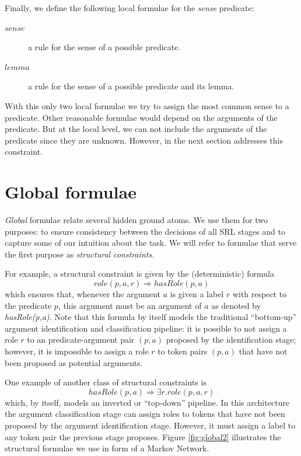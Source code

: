 Finally, we define the following local formulae for the \emph{sense} predicate:
\begin{description}
    \item[$sense$] a rule for the sense of a possible predicate.
    \item[$lemma$] a rule for the sense of a possible predicate and its lemma.
\end{description}
With this only two local formulae we try to assign the most common sense to a
predicate. Other reasonable formulae would depend on the arguments of the
predicate. But at the local level, we can not include the arguments of the
predicate since they are unknown. However, in the next section addresses this
constraint.

\section{Global formulae}
\label{sec:global}

\emph{Global} formulae relate several hidden ground atoms. We use them for two purposes: to ensure consistency between the decisions of all SRL stages and to capture some of our intuition about the task. We will refer to formulae that serve the first purpose as \emph{structural constraints}. 

For example, a structural constraint is given by the (deterministic) formula
\[role(p,a,r) \Rightarrow hasRole(p,a)\]
which ensures that, whenever the argument $a$ is given a label $r$ with respect to the predicate $p$, this argument must be an argument of $a$ as denoted by \emph{hasRole(p,a)}. Note that this formula by itself models the traditional ``bottom-up'' argument identification and classification pipeline: it is possible to not assign a role $r$ to an predicate-argument pair $(p,a)$ proposed by the identification stage; however, it is impossible to assign a role $r$ to token pairs $(p,a)$ that have not been proposed as potential arguments.

One example of another class of structural constraints is 
\[
hasRole(p,a)\Rightarrow\exists r.role(p,a,r)
\]
which, by itself, models an inverted or ``top-down'' pipeline. In this architecture the argument classification stage can assign roles to tokens that have not been proposed by the argument identification stage. However, it must assign a label to any token pair the previous stage proposes. 
Figure \ref{fig:global2} illustrates the structural formulae we use in form of a Markov Network.

